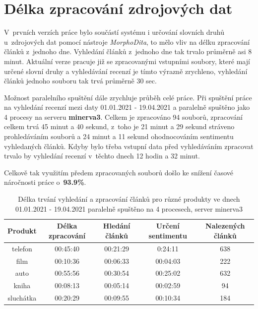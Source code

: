 \section{Délka zpracování zdrojových dat}

V~prvních verzích práce bylo součástí systému i určování slovních druhů u~zdrojových dat pomocí nástroje \textit{MorphoDita}, to mělo vliv na délku zpracování článků z~jednoho dne. Vyhledání článků z~jednoho dne tak trvalo průměrně asi 8 minut. Aktuální verze pracuje již se zpracovanými vstupními soubory, které mají určené slovní druhy a vyhledávání recenzí je tímto výrazně zrychleno, vyhledání článků jednoho souboru tak trvá průměrně 30 sec.


Možnost paralelního spuštění dále zrychluje průběh celé práce. Při spuštění práce na vyhledání recenzí mezi daty 01.01.2021 - 19.04.2021 a paralelně spuštěno jako 4 procesy na serveru \textbf{minerva3}. Celkem je zpracováno 94 souborů, zpracování celkem trvá 45 minut a 40 sekund, z~toho je 21 minut a 29 sekund stráveno prohledáváním souborů a 24 minut a 11 sekund ohodnocováním sentimentu vyhledaných článků. Kdyby bylo třeba vstupní data před vyhledáváním zpracovat trvalo by vyhledání recenzí v~těchto dnech 12 hodin a 32 minut.

Celkově tak využitím předem zpracovaných souborů došlo ke snížení časové náročnosti práce o~\textbf{93.9\%}. 


\begin{table}[h]
    \centering
    \begin{tabular}{|c|c|c|c|c|}
        \hline
        Produkt & Délka zpracování & Hledání článků & Určení sentimentu &{\small Nalezených článků}\\
        \hline\hline
        telefon  & 00:45:40  & 00:21:29 & 0:24:11 & 638\\
        \hline
        film  & 00:10:36 & 00:06:33 & 00:04:03 & 222\\
        \hline
        auto  & 00:55:56  & 00:30:54 & 00:25:02 & 632\\
        \hline
        kniha  & 00:08:13  & 00:05:14 & 00:02:59 & 94\\
        \hline
        sluchátka  & 00:20:29  & 00:09:55 & 00:10:34 & 184\\
        \hline
    \end{tabular}
    \caption{Délka trvání vyhledání a zpracování článků pro různé produkty ve dnech 01.01.2021 - 19.04.2021 paralelně spuštěno na 4 procesech, server minerva3}
    \label{tab:delka_zpracovani}
\end{table}

